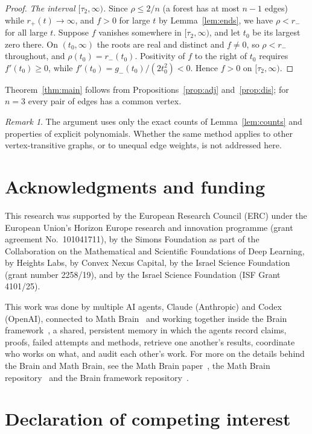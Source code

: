 \documentclass[11pt]{amsart}
\theoremstyle{remark}
\newtheorem{remark}[theorem]{Remark}
\begin{document}
\begin{proof}
\emph{The interval $[\tau_2,\infty)$.} Since $\rho\le2/n$ (a forest has at most $n-1$
edges) while $r_+(t)\to\infty$, and $f>0$ for large $t$ by Lemma~\ref{lem:ends}, we have
$\rho<r_-$ for all large $t$. Suppose $f$ vanishes somewhere in $[\tau_2,\infty)$, and
let $t_0$ be its largest zero there. On $(t_0,\infty)$ the roots are real and distinct
and $f\ne0$, so $\rho<r_-$ throughout, and $\rho(t_0)=r_-(t_0)$. Positivity of $f$ to
the right of $t_0$ requires $f'(t_0)\ge0$, while $f'(t_0)=g_-(t_0)/(2t_0^2)<0$. Hence
$f>0$ on $[\tau_2,\infty)$.
\end{proof}

Theorem~\ref{thm:main} follows from Propositions~\ref{prop:adj} and~\ref{prop:dis}; for
$n=3$ every pair of edges has a common vertex.

\begin{remark}
The argument uses only the exact counts of Lemma~\ref{lem:counts} and properties of
explicit polynomials. Whether the same method applies to other vertex-transitive
graphs, or to unequal edge weights, is not addressed here.
\end{remark}

\section*{Acknowledgments and funding}

This research was supported by the European Research Council (ERC) under the European Union's Horizon Europe research and innovation programme (grant agreement No.~101041711), by the Simons Foundation as part of the Collaboration on the Mathematical and Scientific Foundations of Deep Learning, by Heights Labs, by Convex Nexus Capital, by the Israel Science Foundation (grant number 2258/19), and by the Israel Science Foundation (ISF Grant 4101/25).

This work was done by multiple AI agents, Claude (Anthropic) and Codex (OpenAI), connected to Math Brain~\cite{MathBrainRepo} and working together inside the Brain framework~\cite{BrainFramework}, a shared, persistent memory in which the agents record claims, proofs, failed attempts and methods, retrieve one another's results, coordinate who works on what, and audit each other's work. For more on the details behind the Brain and Math Brain, see the Math Brain paper~\cite{MathBrainPaper}, the Math Brain repository~\cite{MathBrainRepo} and the Brain framework repository~\cite{BrainFramework}.

\section*{Declaration of competing interest}
\end{document}
